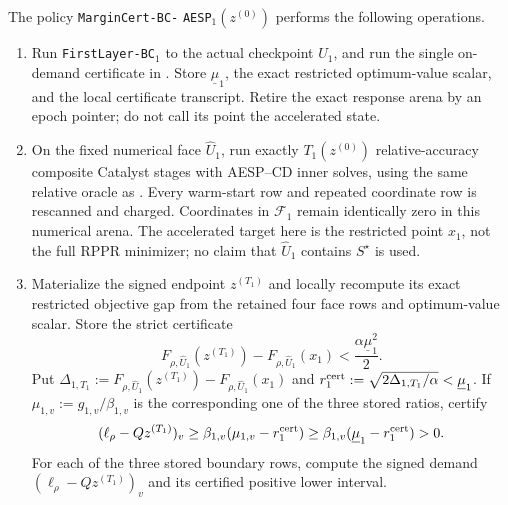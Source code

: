 \begin{definition}
\label{def:branch-caterpillar-first-layer-numerical-policy}
The policy \texttt{MarginCert-BC-}\allowbreak
\texttt{AESP}$_1(z^{(0)})$ performs the following operations.
\begin{enumerate}
 \item Run \texttt{FirstLayer-BC}$_1$ to the actual checkpoint
       $\widehat U_1$, and run the single on-demand certificate in
       .  Store
       $\underline\mu_1$, the exact restricted optimum-value scalar, and the
       local certificate transcript.  Retire the exact response arena by an
       epoch pointer; do not call its point the accelerated state.
 \item On the fixed numerical face $\widehat U_1$, run exactly
       $T_1(z^{(0)})$ relative-accuracy composite Catalyst stages with
       AESP--CD inner solves, using the same relative oracle as
       .  Every warm-start
       row and repeated coordinate row is rescanned and charged.  Coordinates
       in $\mathcal F_1$ remain identically zero in this numerical arena.  The
       accelerated target here is the restricted point $x_1$, not the full
       RPPR minimizer; no claim that $\widehat U_1$ contains $S^\star$ is used.
 \item Materialize the signed endpoint $z^{(T_1)}$ and locally recompute its
       exact restricted objective gap from the retained four face rows and
       optimum-value scalar.  Store the strict certificate
       \[
        F_{\rho,\widehat U_1}(z^{(T_1)})
        -F_{\rho,\widehat U_1}(x_1)
       <\frac{\alpha\underline\mu_1^2}{2}.
       \]
       Put
       $\Delta_{1,T_1}:=
       F_{\rho,\widehat U_1}(z^{(T_1)})-
       F_{\rho,\widehat U_1}(x_1)$ and
       $r_1^{\rm cert}:=\sqrt{2\Delta_{1,T_1}/\alpha}
       <\underline\mu_1$.  If $\mu_{1,v}:=g_{1,v}/\beta_{1,v}$ is the
       corresponding one of the three stored ratios, certify
       \begin{equation}
        (\ell_\rho-Qz^{(T_1)})_v
        \geq\beta_{1,v}(\mu_{1,v}-r_1^{\rm cert})
        \geq\beta_{1,v}(\underline\mu_1-r_1^{\rm cert})>0.
        \label{eq:branch-caterpillar-first-layer-numerical-positive-interval}
       \end{equation}
       For each of the three stored boundary rows, compute the signed demand
       $(\ell_\rho-Qz^{(T_1)})_v$ and its certified positive lower interval.

\end{enumerate}
\end{definition}
